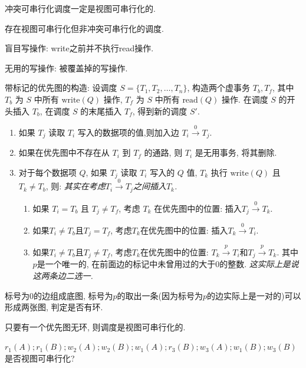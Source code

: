 \begin{corollary}
  冲突可串行化调度一定是视图可串行化的.
\end{corollary}

\begin{corollary}
  存在视图可串行化但非冲突可串行化的调度.
\end{corollary}

盲目写操作: write之前并不执行read操作.

无用的写操作: 被覆盖掉的写操作.

带标记的优先图的构造:
设调度 $ S = \{ T_1, T_2, \ldots, T_n \} $, 构造两个虚事务 $ T_b, T_f $, 
其中 $ T_b $ 为 $ S $ 中所有 $ \text{write}(Q) $ 操作, 
$ T_f $ 为 $ S $ 中所有 $ \text{read}(Q) $ 操作. 
在调度 $ S $ 的开头插入 $ T_b $, 在调度 $ S $ 的末尾插入 $ T_f $, 得到新的调度 $ S' $.
\begin{enumerate}
    \item 如果 $ T_j $ 读取 $ T_i $ 写入的数据项的值,则加入边 $ T_i \overset{0}{\to} T_j $.
    \item 如果在优先图中不存在从 $ T_i $ 到 $ T_f $ 的通路, 则 $ T_i $ 是无用事务, 将其删除.
    \item 对于每个数据项 $ Q $, 如果 $ T_j $ 读取 $ T_i $ 写入的 $ Q $ 值, $ T_k $ 执行 $ \text{write}(Q) $ 且 $ T_k \neq T_b $, 则: \textit{其实在考虑$T_i \overset{0}{\to} T_j$之间插入$T_k$.}
    \begin{enumerate}
        \item 如果 $ T_i = T_b $ 且 $ T_j \neq T_f $, 考虑 $ T_k $ 在优先图中的位置: 插入$T_j\overset{0}{\to}T_k$.
        \item 如果$T_i\neq T_b$且$T_j=T_f$, 考虑$T_k$在优先图中的位置: 插入$T_k\overset{0}{\to} T_i$.
        \item 如果$T_i\neq T_b$且$T_j\neq T_f$, 考虑$T_k$在优先图中的位置: $T_k\overset{p}{\to} T_i$和$T_j\overset{p}{\to} T_k$. 其中$p$是一个唯一的, 在前面边的标记中未曾用过的大于0的整数.
        \textit{这实际上是说这两条边二选一.}
    \end{enumerate}
\end{enumerate}
标号为0的边组成底图, 标号为$p$的取出一条(因为标号为$p$的边实际上是一对的)可以形成两张图, 判定是否有环.

\begin{theorem}[视图可串行化判定准则]
  只要有一个优先图无环, 则调度是视图可串行化的.
\end{theorem}

\begin{example}\label{thm:shitu}
  $r_1(A);r_1(B);w_2(A);w_2(B);w_1(A);r_3(B);w_3(A);w_1(B);w_3(B)$是否视图可串行化?
\end{example}

